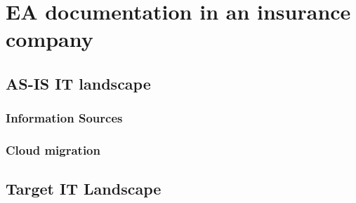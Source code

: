 

\chapter{EA documentation in an insurance company}\label{chapter:EA documentation in an insurance company} 

\section{AS-IS IT landscape}

\subsection{Information Sources}

\subsection{Cloud migration}

\section{Target IT Landscape}











